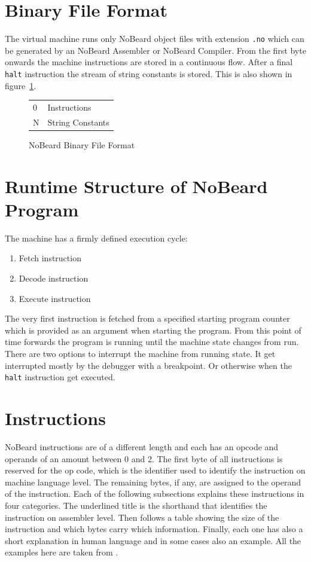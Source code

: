 \section{Binary File Format}
The virtual machine runs only NoBeard object files with extension \lstinline$.no$ which can be generated by an NoBeard Assembler or NoBeard Compiler. From the first byte onwards the machine instructions are stored in a continuous flow. After a final \lstinline$halt$ instruction the stream of string constants is stored. This is also shown in figure~\ref{fig:binaryfileformat}.

\begin{figure}[h]
\begin{center}
\begin{tabular}{p{8em}|p{8em}|}
\cline{2-2}
\parbox[t][3em][t]{8em}{\hfill 0} & Instructions \\[3em] 
\parbox[b][2em][b]{8em}{\hfill N} & String Constants \\ 
\end{tabular}
\end{center}
\caption{NoBeard Binary File Format}\label{fig:binaryfileformat}
\end{figure}

\section{Runtime Structure of NoBeard Program}
The machine has a firmly defined execution cycle:
\begin{enumerate}
\item Fetch instruction
\item Decode instruction
\item Execute instruction
\end{enumerate}
The very first instruction is fetched from a specified starting program counter which is provided as an argument when starting the program. From this point of time forwards the program is running until the machine state changes from run. There are two options to interrupt the machine from running state. It get interrupted mostly by the debugger with a breakpoint. Or otherwise when the \lstinline$halt$ instruction get executed.
\section{Instructions}\label{sec:instructions}
NoBeard instructions are of a different length and each has an opcode and operands of an amount between 0 and 2. The first byte of all instructions is reserved for the op code, which is the identifier used to identify the instruction on machine language level. The remaining bytes, if any, are assigned to the operand of the instruction.
Each of the following subsections explains these instructions in four categories. The underlined title is the shorthand that identifies the instruction on assembler level. Then follows a table showing the size of the instruction and which bytes carry which information. Finally, each one has also a short explanation in human language and in some cases also an example. All the examples here are taken from \cite{bauer_p._2017}.

